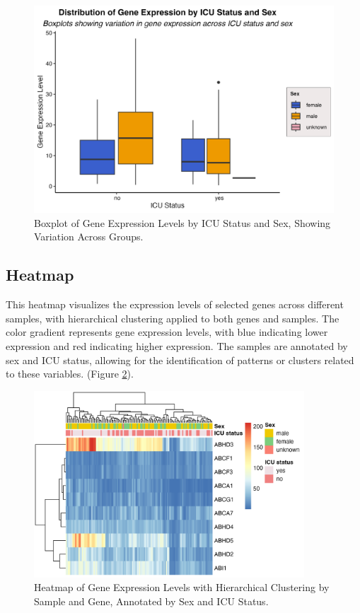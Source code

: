 \documentclass[12pt]{article}
\begin{document}
\begin{figure}[H]
    \centering
    \includegraphics[width = \textwidth]{final_box_plot.png}
    \caption{Boxplot of Gene Expression Levels by ICU Status and Sex, Showing Variation Across Groups.}
    \label{final_box_plot}
\end{figure}

\subsection{Heatmap}
This heatmap visualizes the expression levels of selected genes across different samples, with hierarchical clustering applied to both genes and samples. The color gradient represents gene expression levels, with blue indicating lower expression and red indicating higher expression. The samples are annotated by sex and ICU status, allowing for the identification of patterns or clusters related to these variables. (Figure \ref{final_heatmap}).

\begin{figure}[H]
    \centering
    \includegraphics[width=0.9\textwidth, height=0.4\textheight]{final_heatmap.png}
    \caption{Heatmap of Gene Expression Levels with Hierarchical Clustering by Sample and Gene, Annotated by Sex and ICU Status.}
    \label{final_heatmap}
\end{figure}
\end{document}
